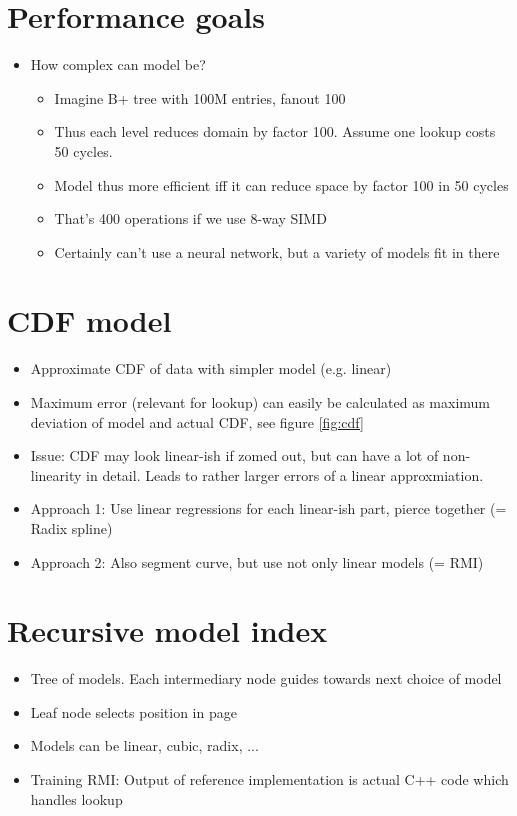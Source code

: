 \documentclass[a4paper]{scrreprt}
\begin{document}
\section{Performance goals}

\begin{itemize}
		\item How complex can model be?
				\begin{itemize}
						\item Imagine B+ tree with 100M entries, fanout 100
						\item Thus each level reduces domain by factor 100.
								Assume one lookup costs 50 cycles.
						\item Model thus more efficient iff it can reduce space
								by factor 100 in 50 cycles
						\item That's 400 operations if we use 8-way SIMD
						\item Certainly can't use a neural network, but a
								variety of models fit in there
				\end{itemize}
\end{itemize}

\section{CDF model}

\begin{itemize}
		\item Approximate CDF of data with simpler model (e.g. linear)
		\item Maximum error (relevant for lookup) can easily be calculated as
				maximum deviation of model and actual CDF, see figure
				\ref{fig:cdf}
		\item Issue: CDF may look linear-ish if zomed out, but can have a lot
				of non-linearity in detail. Leads to rather larger errors of a
				linear approxmiation.
		\item Approach 1: Use linear regressions for each linear-ish part, pierce together (= Radix spline)
		\item Approach 2: Also segment curve, but use not only linear models (= RMI)
\end{itemize}

\section{Recursive model index}

\begin{itemize}
		\item Tree of models. Each intermediary node guides towards next choice of model
		\item Leaf node selects position in page
		\item Models can be linear, cubic, radix, ...
		\item Training RMI: Output of reference implementation is actual C++
				code which handles lookup
\end{itemize}
\end{document}

